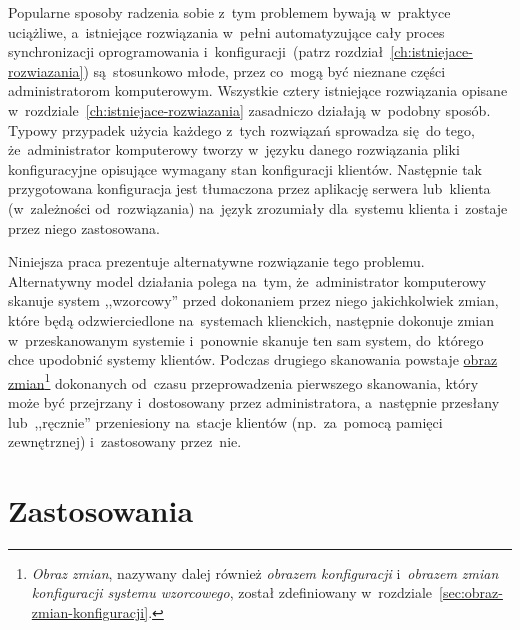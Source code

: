 \documentclass[thesis]{subfiles}
\begin{document}
Popularne sposoby radzenia sobie z~tym problemem bywają w~praktyce uciążliwe, a~istniejące rozwiązania w~pełni automatyzujące cały proces synchronizacji oprogramowania i~konfiguracji~(patrz rozdział~\ref{ch:istniejace-rozwiazania}) są~stosunkowo młode, przez co~mogą być nieznane części administratorom komputerowym. Wszystkie cztery istniejące rozwiązania opisane w~rozdziale~\ref{ch:istniejace-rozwiazania} zasadniczo działają w~podobny sposób. Typowy przypadek użycia każdego z~tych rozwiązań sprowadza się~do tego, że~administrator komputerowy tworzy w~języku danego rozwiązania pliki konfiguracyjne opisujące wymagany stan konfiguracji klientów. Następnie tak przygotowana konfiguracja jest tłumaczona przez aplikację serwera lub~klienta (w~zależności od~rozwiązania) na~język zrozumiały dla~systemu klienta i~zostaje przez niego zastosowana.

Niniejsza praca prezentuje alternatywne rozwiązanie tego problemu. Alternatywny model działania polega na~tym, że~administrator komputerowy skanuje system ,,wzorcowy'' przed dokonaniem przez niego jakichkolwiek zmian, które będą odzwierciedlone na~systemach klienckich, następnie dokonuje zmian w~przeskanowanym systemie i~ponownie skanuje ten sam system, do~którego chce upodobnić systemy klientów. Podczas drugiego skanowania powstaje \hyperref[sec:obraz-zmian-konfiguracji]{obraz zmian}\footnote{\emph{Obraz zmian}, nazywany dalej również \emph{obrazem konfiguracji} i~\emph{obrazem zmian konfiguracji systemu wzorcowego}, został zdefiniowany w~rozdziale~\ref{sec:obraz-zmian-konfiguracji}.} dokonanych od~czasu przeprowadzenia pierwszego skanowania, który może być przejrzany i~dostosowany przez administratora, a~następnie przesłany lub~,,ręcznie'' przeniesiony na~stacje klientów (np.~za~pomocą pamięci zewnętrznej) i~zastosowany przez~nie.


\section{Zastosowania}
\end{document}
